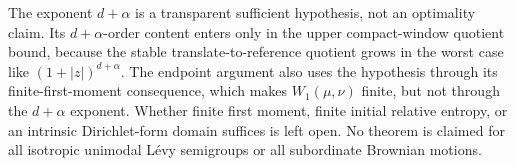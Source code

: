 The exponent \(d+\alpha\) is a transparent sufficient hypothesis, not an
optimality claim.  Its \(d+\alpha\)-order content enters only in the upper
compact-window quotient bound, because the stable translate-to-reference
quotient grows in the worst case like \((1+|z|)^{d+\alpha}\).  The endpoint
argument also uses the hypothesis through its finite-first-moment
consequence, which makes \(W_1(\mu,\nu)\) finite, but not through the
\(d+\alpha\) exponent.  Whether finite first moment, finite initial relative
entropy, or an intrinsic Dirichlet-form domain suffices is left open.  No
theorem is claimed for all isotropic unimodal L\'evy semigroups or all
subordinate Brownian motions.
